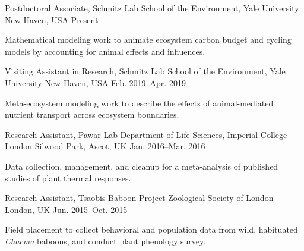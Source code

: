 

\begin{cventries}

  \cventry
    {Postdoctoral Associate, Schmitz Lab} %
    {School of the Environment, Yale University} %
    {New Haven, USA} %
    {Present} %
    {
      \begin{cvitems} %
        \item {Mathematical modeling work to animate ecosystem carbon budget and cycling models by accounting for animal effects and influences.}
      \end{cvitems} 
    }

  \cventry
    {Visiting Assistant in Research, Schmitz Lab} %
    {School of the Environment, Yale University} %
    {New Haven, USA} %
    {Feb. 2019--Apr. 2019} %
    {
      \begin{cvitems} %
        \item {Meta-ecosystem modeling work to describe the effects of animal-mediated nutrient transport across ecosystem boundaries.}
      \end{cvitems}  
    }

  \cventry
    {Research Assistant, Pawar Lab} %
    {Department of Life Sciences, Imperial College London} %
    {Silwood Park, Ascot, UK} %
    {Jan. 2016--Mar. 2016} %
    {
      \begin{cvitems} %
        \item {Data collection, management, and cleanup for a meta-analysis of published studies of plant thermal responses.}
      \end{cvitems}  
    }

  \cventry
    {Research Assistant, Tsaobis Baboon Project} %
    {Zoological Society of London} %
    {London, UK} %
    {Jun. 2015--Oct. 2015} %
    {
       \begin{cvitems} %
        \item {Field placement to collect behavioral and population data from wild, habituated \textit{Chacma} baboons, and conduct plant phenology survey.}
      \end{cvitems}  
    }


\end{cventries}
